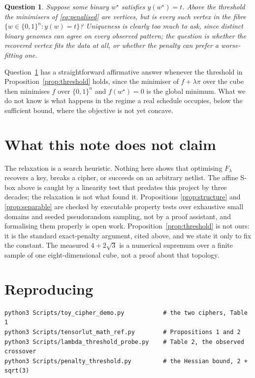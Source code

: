 \documentclass[11pt,a4paper]{article}
\newtheorem{question}{Question}
\begin{document}
\begin{question}
\label{q:fibre}
Suppose some binary $w^\star$ satisfies $y(w^\star)=t$. Above the threshold the
minimisers of \eqref{eq:penalised} are vertices, but is every such vertex in the
fibre $\{w\in\{0,1\}^n : y(w)=t\}$? Uniqueness is clearly too much to ask, since
distinct binary genomes can agree on every observed pattern; the question is
whether the recovered vertex fits the data at all, or whether the penalty can
prefer a worse-fitting one.
\end{question}

Question~\ref{q:fibre} has a straightforward affirmative answer whenever the
threshold in Proposition~\ref{prop:threshold} holds, since the minimiser of
$f+\lambda\pi$ over the cube then minimises $f$ over $\{0,1\}^n$ and $f(w^\star)=0$
is the global minimum. What we do not know is what happens in the regime a real
schedule occupies, below the sufficient bound, where the objective is not yet
concave.

\section{What this note does not claim}

The relaxation is a search heuristic. Nothing here shows that optimising
$F_\lambda$ recovers a key, breaks a cipher, or succeeds on an arbitrary netlist.
The affine S-box above is caught by a linearity test that predates this project
by three decades; the relaxation is not what found it. Propositions
\ref{prop:structure} and \ref{prop:separable} are checked by executable property
tests over exhaustive small domains and seeded pseudorandom sampling, not by a
proof assistant, and formalising them properly is open work.
Proposition~\ref{prop:threshold} is not ours: it is the standard exact-penalty
argument, cited above, and we state it only to fix the constant. The measured
$4+2\sqrt3$ is a numerical supremum over a finite sample of one eight-dimensional
cube, not a proof about that topology.

\section{Reproducing}

\begin{verbatim}
python3 Scripts/toy_cipher_demo.py           # the two ciphers, Table 1
python3 Scripts/tensorlut_math_ref.py        # Propositions 1 and 2
python3 Scripts/lambda_threshold_probe.py    # Table 2, the observed crossover
python3 Scripts/penalty_threshold.py         # the Hessian bound, 2 + sqrt(3)
\end{verbatim}
\end{document}
